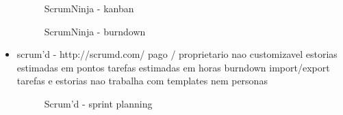 \begin{itemize}
\begin{figure}[H]
  \centering
  \caption{ScrumNinja - kanban}
\end{figure}

\begin{figure}[H]
  \centering
  \caption{ScrumNinja - burndown}
\end{figure}

\item scrum'd - http://scrumd.com/
pago / proprietario
nao customizavel
estorias estimadas em pontos
tarefas estimadas em horas
burndown
import/export tarefas e estorias
nao trabalha com templates nem personas

\begin{figure}[H]
  \centering
  \caption{Scrum'd - sprint planning}
\end{figure}


\end{itemize}
